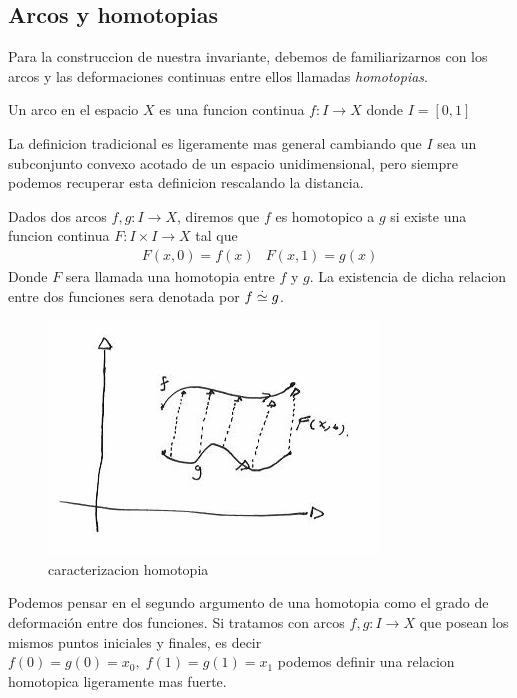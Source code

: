 \subsection{Arcos y homotopias}
Para la construccion de nuestra invariante, debemos de familiarizarnos
con los arcos y las deformaciones continuas entre ellos llamadas
\emph{homotopias}.

\begin{definicion}[Arco]
  Un arco en el espacio \(X\) es una funcion continua \(f : I \to X \)
  donde \(I = [0,1]\)
\end{definicion}
La definicion tradicional es ligeramente mas general cambiando que \(I\)
sea un subconjunto convexo acotado de un espacio unidimensional, pero
siempre podemos recuperar esta definicion rescalando la distancia.

\begin{definicion}[Homotopia]
  Dados dos arcos \(f,g : I \to X\), diremos que \(f\) es homotopico a
  \(g\) si existe una funcion continua \(F : I \times I \to X \) tal que
  \[ \begin{matrix}
      F (x, 0) = f(x) & F (x, 1) = g(x)
     \end{matrix}
  \]
  Donde \(F\) sera llamada una homotopia entre \(f\) y \(g\). La
  existencia de dicha relacion entre dos funciones sera denotada por \(f
  \stackrel{.}{\simeq} g\).
\end{definicion}
\begin{figure}[h]
  \centering
  \includegraphics[scale=0.5]{./imagenes/homotopia-entre-funciones.png}
  \caption{caracterizacion homotopia}
  \label{fig:homotopia-entre-funciones}
\end{figure}
Podemos pensar en el segundo argumento de una homotopia como el grado de
deformación entre dos funciones.
Si tratamos con arcos \(f,g : I \to X\) que posean los mismos puntos
iniciales y finales, es decir \(f(0) = g(0) = x_0, \; f(1) = g(1) =
x_1 \) podemos definir una relacion homotopica ligeramente mas fuerte.

